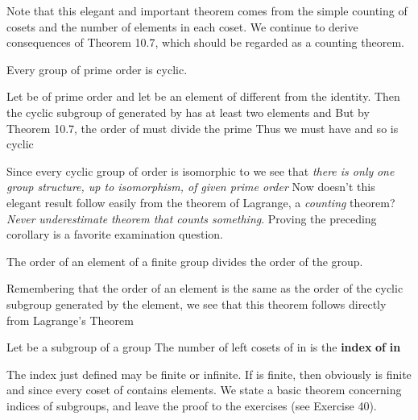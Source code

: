 \documentclass[11pt,oneside]{article}
\begin{document}
\begin{BookBody}
Note that this elegant and important theorem comes from the simple counting of cosets and the number of elements in each coset. We continue to derive consequences of Theorem 10.7, which should be regarded as a counting theorem.

 Every group of prime order is cyclic.

 Let  be of prime order  and let  be an element of  different from the identity. Then the cyclic subgroup  of  generated by  has at least two elements and  But by Theorem 10.7, the order  of  must divide the prime  Thus we must have  and  so  is cyclic\BookEnd{\blacklozenge}

Since every cyclic group of order  is isomorphic to  we see that\textit{ there is only} \textit{one group structure, up to isomorphism, of}  \textit{given prime order}  Now doesn’t this elegant result follow easily from the theorem of Lagrange, a\textit{ counting} theorem?\textit{ Never} \textit{underestimate}  \textit{theorem that counts something}. Proving the preceding corollary is a favorite examination question.

 The order of an element of a finite group divides the order of the group.

 Remembering that the order of an element is the same as the order of the cyclic subgroup generated by the element, we see that this theorem follows directly from Lagrange’s Theorem\BookEnd{\blacklozenge}

 Let  be a subgroup of a group  The number of left cosets of  in  is the\textbf{ index}  \textbf{of}  \textbf{in} \BookEnd{\blacksquare}

The index  just defined may be finite or infinite. If  is finite, then obviously  is finite and  since every coset of  contains  elements. We state a basic theorem concerning indices of subgroups, and leave the proof to the exercises (see Exercise 40).

\end{BookBody}
\end{document}
